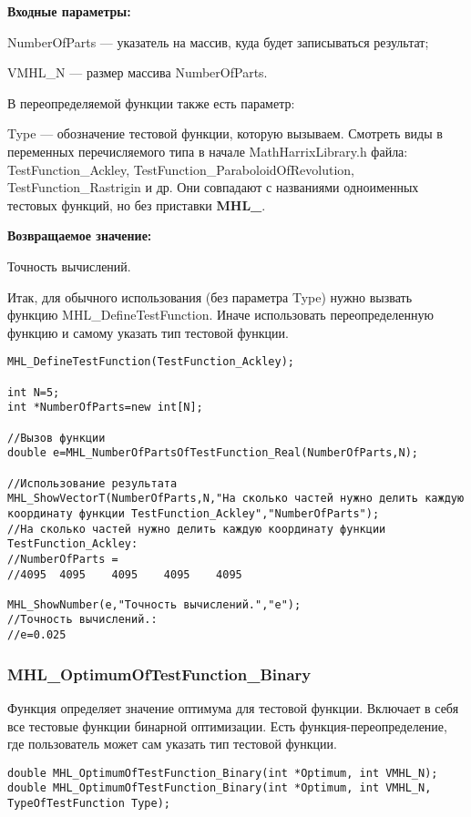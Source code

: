 \documentclass[a4paper,12pt]{article}
\begin{document}
\textbf{Входные параметры:}

NumberOfParts --- указатель на массив, куда будет записываться результат;

VMHL\_N --- размер массива NumberOfParts.

В переопределяемой функции также есть параметр:
  
Type --- обозначение тестовой функции, которую вызываем.
Смотреть виды в переменных перечисляемого типа в начале MathHarrixLibrary.h файла: TestFunction\_Ackley, TestFunction\_ParaboloidOfRevolution, TestFunction\_Rastrigin и др. Они совпадают с названиями одноименных тестовых функций, но без приставки \textbf{MHL\_}.

\textbf{Возвращаемое значение:}
 
Точность вычислений.

Итак, для обычного использования (без параметра Type) нужно вызвать функцию MHL\_DefineTestFunction. Иначе использовать переопределенную функцию и самому указать тип тестовой функции.


\begin{lstlisting}[label=code_use_MHL_NumberOfPartsOfTestFunction_Real,caption=Пример использования]
MHL_DefineTestFunction(TestFunction_Ackley);

int N=5;
int *NumberOfParts=new int[N];

//Вызов функции
double e=MHL_NumberOfPartsOfTestFunction_Real(NumberOfParts,N);

//Использование результата
MHL_ShowVectorT(NumberOfParts,N,"На сколько частей нужно делить каждую координату функции TestFunction_Ackley","NumberOfParts");
//На сколько частей нужно делить каждую координату функции TestFunction_Ackley:
//NumberOfParts =	
//4095	4095	4095	4095	4095

MHL_ShowNumber(e,"Точность вычислений.","e");
//Точность вычислений.:
//e=0.025
\end{lstlisting}

\subsubsection{MHL\_OptimumOfTestFunction\_Binary}\label{MHL_OptimumOfTestFunction_Binary}

Функция определяет значение оптимума для тестовой функции. Включает в себя все тестовые функции бинарной оптимизации. Есть функция-переопределение, где пользователь может сам указать тип тестовой функции.


\begin{lstlisting}[label=code_syntax_MHL_OptimumOfTestFunction_Binary,caption=Синтаксис]
double MHL_OptimumOfTestFunction_Binary(int *Optimum, int VMHL_N);
double MHL_OptimumOfTestFunction_Binary(int *Optimum, int VMHL_N, TypeOfTestFunction Type);
\end{lstlisting}
\end{document}
